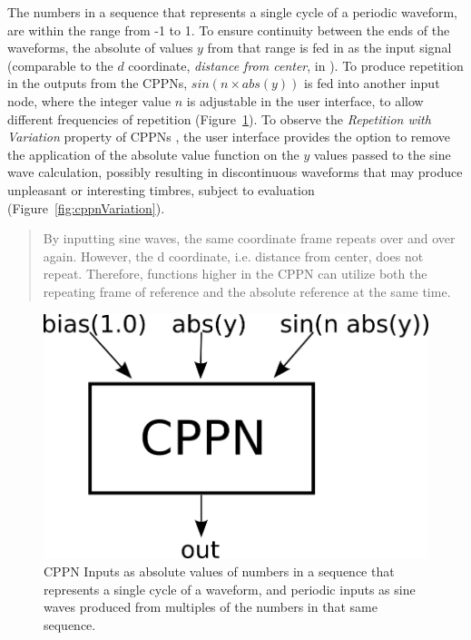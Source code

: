 \documentclass[conference]{IEEEtran}
\begin{document}
The numbers in a sequence that represents a single cycle of a periodic waveform, are within the range from -1 to 1.  To ensure continuity between the ends of the waveforms, the absolute of values $y$ from that range is fed in as the input signal (comparable to the $d$ coordinate, \textit{distance from center}, in \cite{stanley2007compositional}).  To produce repetition in the outputs from the CPPNs, $sin(n\times abs(y))$ is fed into another input node, where the integer value $n$ is adjustable in the user interface, to allow different frequencies of repetition (Figure~\ref{fig:cppnIO}).  To observe the \textit{Repetition with Variation} property of CPPNs \cite[p.~25]{stanley2007compositional}, the user interface provides the option to remove the application of the absolute value function on the $y$ values passed to the sine wave calculation, possibly resulting in discontinuous waveforms that may produce unpleasant or interesting timbres, subject to evaluation (Figure~\ref{fig:cppnVariation}).

\begin{quote}
By inputting sine waves, the same coordinate frame repeats over and over again. However, the d coordinate, i.e. distance from center, does not repeat. Therefore, functions higher in the CPPN can utilize both the repeating frame of reference and the absolute reference at the same time. \cite[p.~25]{stanley2007compositional}
\end{quote}

\begin{figure}[htp]
	\centerline{\includegraphics[width=.8\columnwidth]{cppnIO.png}}
	\caption{CPPN Inputs as absolute values of numbers in a sequence that represents a single cycle of a  waveform, and periodic inputs as sine waves produced from multiples of the numbers in that same sequence.}
	\label{fig:cppnIO}
\end{figure}
\end{document}
